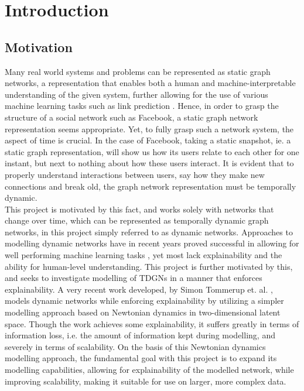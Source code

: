 \section{Introduction}
\label{sec:Intro}


\subsection{Motivation}
\label{sec:Intro:Motivation}
Many real world systems and problems can be represented as static graph networks, a representation that enables both a human and machine-interpretable understanding of the given system, further allowing for the use of various machine learning tasks such as link prediction \cite{GroverNode2vec:Networks} \cite{Hamilton2017RepresentationApplications}.
Hence, in order to grasp the structure of a social network such as Facebook, a static graph network representation seems appropriate.
Yet, to fully grasp such a network system, the aspect of time is crucial.
In the case of Facebook, taking a static snapshot, ie. a static graph representation, will show us how its users relate to each other for one instant, but next to nothing about how these users interact.
It is evident that to properly understand interactions between users, say how they make new connections and break old, the graph network representation must be temporally dynamic.
\\
This project is motivated by this fact, and works solely with networks that change over time, which can be represented as temporally dynamic graph networks, in this project simply referred to as dynamic networks.
Approaches to modelling dynamic networks have in recent years proved successful in allowing for well performing machine learning tasks \cite{Xu2020INDUCTIVEGRAPHS} \cite{Trivedi2019DYREP:GRAPHS} \cite{Rossi2020TEMPORALGRAPHS}, yet most lack explainability and the ability for human-level understanding.
This project is further motivated by this, and seeks to investigate modelling of TDGNs in a manner that enforces explainability. 
A very recent work developed, by Simon Tommerup et. al. \cite{Tommerup2021LearningNetworks}, models dynamic networks while enforcing explainability by utilizing a simpler modelling approach based on Newtonian dynamics in two-dimensional latent space.
Though the work achieves some explainability, it suffers greatly in terms of information loss, i.e. the amount of information kept during modelling, and severely in terms of scalability.
On the basis of this Newtonian dynamics modelling approach, the fundamental goal with this project is to expand its modelling capabilities, allowing for explainability of the modelled network, while improving scalability, making it suitable for use on larger, more complex data.


